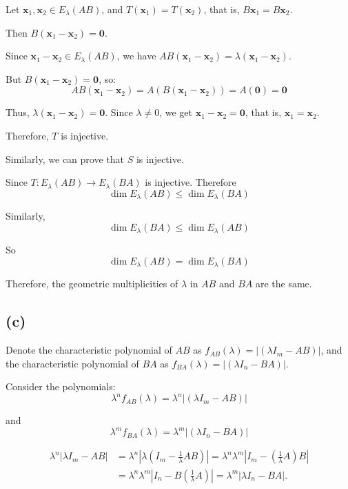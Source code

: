 \documentclass{article}
\begin{document}
Let $ \mathbf{x}_1,\mathbf{x}_2\in E_{\lambda}(AB) $, and $ T(\mathbf{x}_1)=T(\mathbf{x}_2) $, that is, $ B\mathbf{x}_1 = B\mathbf{x}_2 $.

Then $ B(\mathbf{x}_1 - \mathbf{x}_2)=\mathbf{0} $.

Since $ \mathbf{x}_1 - \mathbf{x}_2\in E_{\lambda}(AB) $, we have $ AB(\mathbf{x}_1 - \mathbf{x}_2)=\lambda(\mathbf{x}_1 - \mathbf{x}_2) $.

But $ B(\mathbf{x}_1 - \mathbf{x}_2)=\mathbf{0} $, so:
$$
AB(\mathbf{x}_1 - \mathbf{x}_2)=A(B(\mathbf{x}_1 - \mathbf{x}_2))=A(\mathbf{0})=\mathbf{0}
$$

Thus, $ \lambda(\mathbf{x}_1 - \mathbf{x}_2)=\mathbf{0} $. Since $ \lambda\neq 0 $, we get $ \mathbf{x}_1 - \mathbf{x}_2=\mathbf{0} $, that is, $ \mathbf{x}_1 = \mathbf{x}_2 $.

Therefore, $ T $ is injective.

Similarly, we can prove that $ S $ is injective.

Since $ T: E_{\lambda}(AB)\to E_{\lambda}(BA) $ is injective. Therefore
$$
\dim E_{\lambda}(AB)\leq\dim E_{\lambda}(BA)
$$

Similarly,
$$
\dim E_{\lambda}(BA)\leq\dim E_{\lambda}(AB)
$$

So
$$
\dim E_{\lambda}(AB)=\dim E_{\lambda}(BA)
$$

Therefore, the geometric multiplicities of $ \lambda $ in $ AB $ and $ BA $ are the same.

\subsection*{(c)} 

Denote the characteristic polynomial of $ AB $ as $ f_{AB}(\lambda)=\vert (\lambda I_m - AB)\vert $, and the characteristic polynomial of $ BA $ as $ f_{BA}(\lambda)=\vert(\lambda I_n - BA) \vert $.

Consider the polynomials:
$$
\lambda^n f_{AB}(\lambda) = \lambda^n \vert(\lambda I_m - AB)\vert
$$

and
$$
\lambda^m f_{BA}(\lambda) = \lambda^m \vert(\lambda I_n - BA)\vert
$$

\begin{align*}
	\lambda^n \vert \lambda I_m - AB \vert &= \lambda^n \left\vert \lambda \left( I_m - \frac{1}{\lambda}AB \right) \right\vert = \lambda^n \lambda^m \left\vert I_m - \left( \frac{1}{\lambda}A \right)B \right\vert \\
	&= \lambda^n \lambda^m \left\vert I_n - B \left( \frac{1}{\lambda}A \right) \right\vert = \lambda^m \vert \lambda I_n - BA \vert.
\end{align*}
\end{document}
